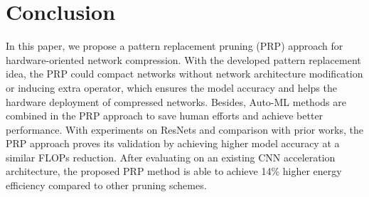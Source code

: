 \documentclass[journal,article,submit,pdftex,moreauthors]{Definitions/mdpi}
\begin{document}
\section{Conclusion}\label{sec: conclusion}
In this paper, we propose a pattern replacement pruning (PRP) approach for hardware-oriented network compression. With the developed pattern replacement idea, the PRP could compact networks without network architecture modification or inducing extra operator, which ensures the model accuracy and helps the hardware deployment of compressed networks. Besides, Auto-ML methods are combined in the PRP approach to save human efforts and achieve better performance. With  experiments on ResNets and comparison with prior works, the PRP approach proves its validation by achieving higher model accuracy at a similar FLOPs reduction. After evaluating on an existing CNN acceleration architecture, the proposed PRP method is able to achieve 14\% higher energy efficiency compared to other pruning schemes.
\end{document}
